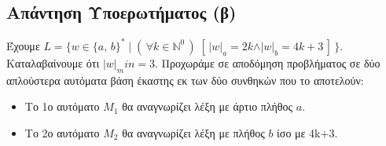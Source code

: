 \subsection{Απάντηση Υποερωτήματος (β)}
\label{ssec:Solution_2.2}
\doublespacing
Έχουμε $L = \{w \in \{a,\, b\}^* \;\vert\; (\,\forall k \in \mathbb{N}^0\,)\;[\,\vert w\vert_a = 2k \land\vert
w\vert_b=4k+3\,]\,\}$.
\\ Καταλαβαίνουμε ότι $\vert w \vert_min = 3.$ Προχωράμε σε αποδόμηση προβλήματος σε δύο απλούστερα αυτόματα βάση έκαστης εκ
των δύο συνθηκών που το αποτελούν:

\begin{itemize}
	\itemsep0em
	\item Το 1ο αυτόματο $M_{1}$ θα αναγνωρίζει λέξη με άρτιο πλήθος $a$.
	\item Το 2ο αυτόματο $M_{2}$ θα αναγνωρίζει λέξη με πλήθος $b$ ίσο με 4k+3.
\end{itemize}


